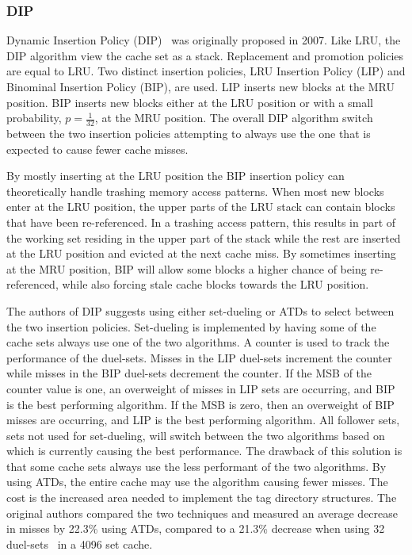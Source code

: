 \subsubsection{DIP}

Dynamic Insertion Policy (DIP)~\cite{Qureshi2007} was originally proposed in 2007.
Like LRU, the DIP algorithm view the cache set as a stack.
Replacement and promotion policies are equal to LRU.
Two distinct insertion policies, LRU Insertion Policy (LIP) and Binominal Insertion Policy (BIP), are used.
LIP inserts new blocks at the MRU position.
BIP inserts new blocks either at the LRU position or with a small probability, $p = \frac{1}{32}$, at the MRU position. 
The overall DIP algorithm switch between the two insertion policies attempting to always use the one that is expected to cause fewer cache misses.

By mostly inserting at the LRU position the BIP insertion policy can theoretically handle trashing memory access patterns.
When most new blocks enter at the LRU position, the upper parts of the LRU stack can contain blocks that have been re-referenced.
In a trashing access pattern, this results in part of the working set residing in the upper part of the stack while the rest are inserted at the LRU position and evicted at the next cache miss.
By sometimes inserting at the MRU position, BIP will allow some blocks a higher chance of being re-referenced, while also forcing stale cache blocks towards the LRU position. 

The authors of DIP suggests using either set-dueling or ATDs to select between the two insertion policies.
Set-dueling is implemented by having some of the cache sets always use one of the two algorithms.
A counter is used to track the performance of the duel-sets.
Misses in the LIP duel-sets increment the counter while misses in the BIP duel-sets decrement the counter.
If the MSB of the counter value is one, an overweight of misses in LIP sets are occurring, and BIP is the best performing algorithm. 
If the MSB is zero, then an overweight of BIP misses are occurring, and LIP is the best performing algorithm.
All follower sets, sets not used for set-dueling, will switch between the two algorithms based on which is currently causing the best performance.
The drawback of this solution is that some cache sets always use the less performant of the two algorithms.
By using ATDs, the entire cache may use the algorithm causing fewer misses.
The cost is the increased area needed to implement the tag directory structures.
The original authors compared the two techniques and measured an average decrease in misses by 22.3\% using ATDs, compared to a 21.3\% decrease when using 32 duel-sets~\cite{Qureshi2007} in a 4096 set cache.

